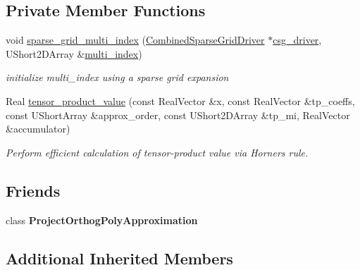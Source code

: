 \subsection*{Private Member Functions}
\begin{DoxyCompactItemize}
\item 
void \hyperlink{classPecos_1_1SharedProjectOrthogPolyApproxData_a2ba69719d75b1ff59bd60a2b6162cdfd}{sparse\+\_\+grid\+\_\+multi\+\_\+index} (\hyperlink{classPecos_1_1CombinedSparseGridDriver}{Combined\+Sparse\+Grid\+Driver} $\ast$\hyperlink{classPecos_1_1SharedProjectOrthogPolyApproxData_a318d97dbe0d8d4293d996be0fd6df99a}{csg\+\_\+driver}, U\+Short2\+D\+Array \&\hyperlink{classPecos_1_1SharedOrthogPolyApproxData_ad93cb921a0df31fce4696f0051fe6a33}{multi\+\_\+index})\label{classPecos_1_1SharedProjectOrthogPolyApproxData_a2ba69719d75b1ff59bd60a2b6162cdfd}

\begin{DoxyCompactList}\small\item\em initialize multi\+\_\+index using a sparse grid expansion \end{DoxyCompactList}\item 
Real \hyperlink{classPecos_1_1SharedProjectOrthogPolyApproxData_abd2d13825375e0140ad5e337af72f6f5}{tensor\+\_\+product\+\_\+value} (const Real\+Vector \&x, const Real\+Vector \&tp\+\_\+coeffs, const U\+Short\+Array \&approx\+\_\+order, const U\+Short2\+D\+Array \&tp\+\_\+mi, Real\+Vector \&accumulator)\label{classPecos_1_1SharedProjectOrthogPolyApproxData_abd2d13825375e0140ad5e337af72f6f5}

\begin{DoxyCompactList}\small\item\em Perform efficient calculation of tensor-\/product value via Horner\textquotesingle{}s rule. \end{DoxyCompactList}\end{DoxyCompactItemize}
\subsection*{Friends}
\begin{DoxyCompactItemize}
\item 
class {\bfseries Project\+Orthog\+Poly\+Approximation}\label{classPecos_1_1SharedProjectOrthogPolyApproxData_a9f89a24cc1d6d15a8e1a9a460171f142}

\end{DoxyCompactItemize}
\subsection*{Additional Inherited Members}


